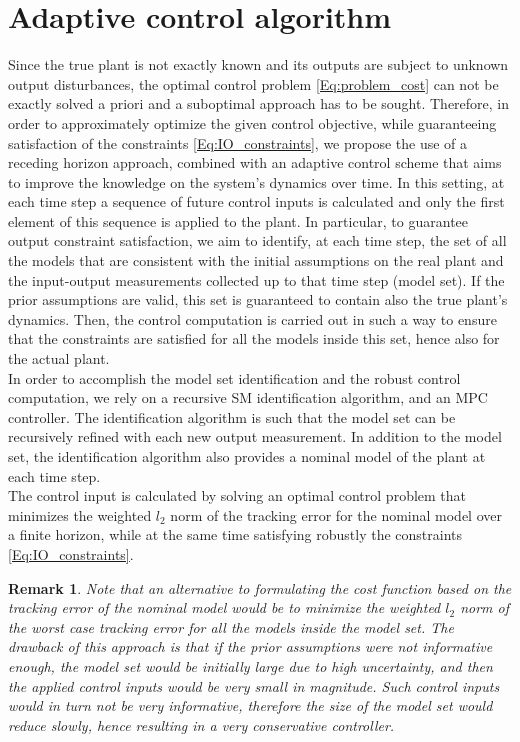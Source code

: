 \documentclass[10 pt, letterpaper]{article}
\newtheorem{remark}{Remark}[section]
\begin{document}
\section{Adaptive control algorithm}\label{S:Overall_algorithm}
Since the true plant is not exactly known and its outputs are subject to unknown output disturbances, the optimal control problem \eqref{Eq:problem_cost} can not be exactly solved a priori and a suboptimal approach has to be sought. Therefore, in order to approximately optimize the given control objective, while guaranteeing satisfaction of the constraints \eqref{Eq:IO_constraints}, we propose the use of a receding horizon approach, combined with an adaptive control scheme that aims to improve the knowledge on the system's dynamics over time. In this setting, at each time step a sequence of future control inputs is calculated and only the first element of this sequence is applied to the plant. In particular, to guarantee output constraint satisfaction, we aim to identify, at each time step, the set of all the models that are consistent with the initial assumptions on the real plant and the input-output measurements collected up to that time step (model set). If the prior assumptions are valid, this set is guaranteed to contain also the true plant's dynamics. Then, the control computation is carried out in such a way to ensure that the constraints are satisfied for all the models inside this set, hence also for the actual plant.\\
In order to accomplish the model set identification and the robust control computation, we rely on a recursive SM identification algorithm, and an MPC controller. The identification algorithm is such that the model set can be recursively refined with each new output measurement. In addition to the model set, the identification algorithm also provides a nominal model of the plant at each time step.\\
The control input is calculated by solving an optimal control problem that minimizes the weighted $l_2$ norm of the tracking error for the nominal model over a finite horizon, while at the same time satisfying robustly the constraints \eqref{Eq:IO_constraints}.
\begin{remark}\label{R:why_nominal_model}
Note that an alternative to formulating the cost function based on the tracking error of the nominal model would be to minimize the weighted $l_2$ norm of the worst case tracking error for all the models inside the model set. The drawback of this approach is that if the prior assumptions were not informative enough, the model set would be initially large due to high uncertainty, and then the applied control inputs would be very small in magnitude. Such control inputs would in turn not be very informative, therefore the size of the model set would reduce slowly, hence resulting in a very conservative controller.
\end{remark}
\end{document}
